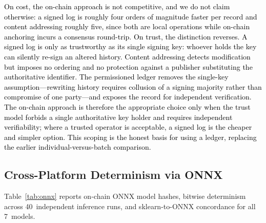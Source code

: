 \documentclass[conference]{IEEEtran}
\begin{document}
\textcolor{black}{On cost, the on-chain approach is not competitive,
and we do not claim otherwise: a signed log is roughly four
orders of magnitude faster per record and content addressing
roughly five, since both are local operations while on-chain
anchoring incurs a consensus round-trip. On trust, the
distinction reverses. A signed log is only as trustworthy as
its single signing key: whoever holds the key can silently
re-sign an altered history. Content addressing detects
modification but imposes no ordering and no protection against a
publisher substituting the authoritative identifier. The
permissioned ledger removes the single-key assumption---rewriting
history requires collusion of a signing majority rather than
compromise of one party---and exposes the record for independent
verification. The on-chain approach is therefore the appropriate
choice only when the trust model forbids a single authoritative
key holder and requires independent verifiability; where a
trusted operator is acceptable, a signed log is the cheaper and
simpler option. This scoping is the honest basis for using a
ledger, replacing the earlier individual-versus-batch
comparison.}
\subsection{\textbf{Cross-Platform Determinism via ONNX}}
\label{sec:onnx-results}

Table~\ref{tab:onnx} reports on-chain ONNX model hashes,
bitwise determinism across 40~independent inference runs,
and sklearn-to-ONNX concordance for all 7~models.
\end{document}
